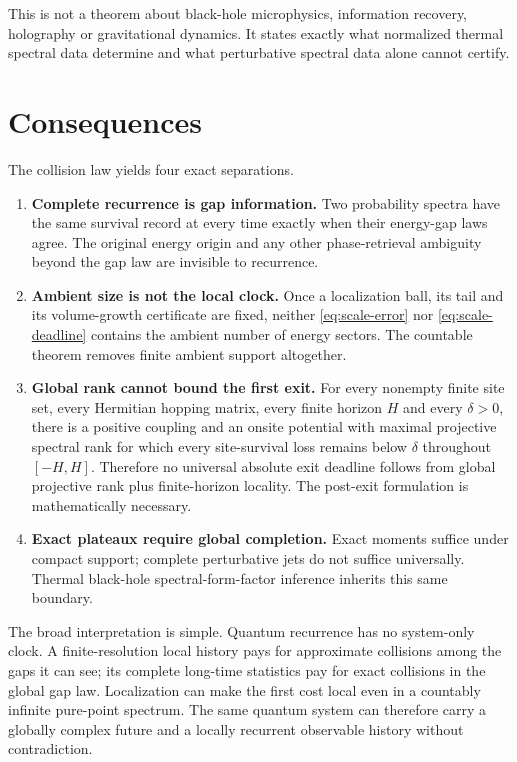 \documentclass[10pt]{article}
\theoremstyle{definition}
\begin{document}
This is not a theorem about black-hole microphysics, information recovery,
holography or gravitational dynamics. It states exactly what normalized
thermal spectral data determine and what perturbative spectral data alone
cannot certify.

\section*{Consequences}

The collision law yields four exact separations.
\begin{enumerate}[leftmargin=2.2em]
 \item \textbf{Complete recurrence is gap information.} Two probability
 spectra have the same survival record at every time exactly when their
 energy-gap laws agree. The original energy origin and any other
 phase-retrieval ambiguity beyond the gap law are invisible to recurrence.
 \item \textbf{Ambient size is not the local clock.} Once a localization
 ball, its tail and its volume-growth certificate are fixed, neither
 \eqref{eq:scale-error} nor \eqref{eq:scale-deadline} contains the ambient
 number of energy sectors. The countable theorem removes finite ambient
 support altogether.
 \item \textbf{Global rank cannot bound the first exit.} For every
 nonempty finite site set, every Hermitian hopping matrix, every finite
 horizon \(H\) and every \(\delta>0\), there is a positive coupling and an
 onsite potential with maximal projective spectral rank for which every
 site-survival loss remains below \(\delta\) throughout \([-H,H]\).
 Therefore no universal absolute exit deadline follows from global
 projective rank plus finite-horizon locality. The post-exit formulation is
 mathematically necessary.
 \item \textbf{Exact plateaux require global completion.} Exact moments
 suffice under compact support; complete perturbative jets do not suffice
 universally. Thermal black-hole spectral-form-factor inference inherits
 this same boundary.
\end{enumerate}

The broad interpretation is simple. Quantum recurrence has no
system-only clock. A finite-resolution local history pays for approximate
collisions among the gaps it can see; its complete long-time statistics pay
for exact collisions in the global gap law. Localization can make the first
cost local even in a countably infinite pure-point spectrum. The same
quantum system can therefore carry a globally complex future and a locally
recurrent observable history without contradiction.
\end{document}

